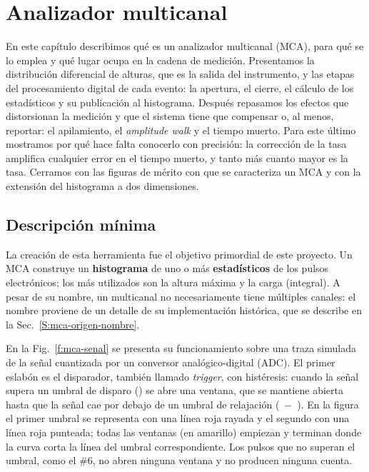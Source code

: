 \chapter{Analizador multicanal}
\label{C:mca}

\graphicspath{{figs/cap1/}{figs/comunes/}}

\begin{destacado}
En este capítulo describimos qué es un analizador multicanal (MCA), para qué se
lo emplea y qué lugar ocupa en la cadena de medición. Presentamos la
distribución diferencial de alturas, que es la salida del instrumento, y las
etapas del procesamiento digital de cada evento: la apertura, el cierre, el
cálculo de los estadísticos y su publicación al histograma. Después repasamos
los efectos que distorsionan la medición y que el sistema tiene que compensar o,
al menos, reportar: el apilamiento, el \emph{amplitude walk} y el tiempo muerto.
Para este último mostramos por qué hace falta conocerlo con precisión: la
corrección de la tasa amplifica cualquier error en el tiempo muerto, y tanto más
cuanto mayor es la tasa. Cerramos con las figuras de mérito con que se
caracteriza un MCA y con la extensión del histograma a dos dimensiones.
\end{destacado}

\section{Descripción mínima}
\label{S:mca-descripcion-minima}

La creación de esta herramienta fue el objetivo primordial de este proyecto. Un
MCA construye un \textbf{histograma} de uno o más \textbf{estadísticos} de los
pulsos electrónicos; los más utilizados son la altura máxima y la carga
(integral). A pesar de su nombre, un multicanal no necesariamente tiene
múltiples canales: el nombre proviene de un detalle de su implementación
histórica, que se describe en la Sec.~\ref{S:mca-origen-nombre}.

En la Fig.~\ref{f:mca-senal} se presenta su funcionamiento sobre una traza
simulada de la señal cuantizada por un conversor analógico-digital (ADC). El
primer eslabón es el disparador, también llamado \emph{trigger}, con
histéresis: cuando la señal supera un umbral de disparo () se abre
una ventana, que se mantiene abierta hasta que la señal cae por debajo de un
umbral de relajación (~$-$~). En la figura el primer
umbral se representa con una línea roja rayada y el segundo con una línea roja
punteada; todas las ventanas (en amarillo) empiezan y terminan donde la curva
corta la línea del umbral correspondiente. Los pulsos que no superan el umbral,
como el \#6, no abren ninguna ventana y no producen ninguna cuenta.

